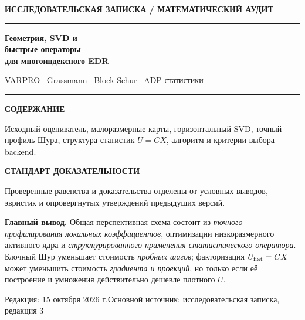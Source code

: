 \documentclass[10.5pt,a4paper]{article}
\numberwithin{equation}{section}
\theoremstyle{plain}
\theoremstyle{definition}
\newcommand{\smallcaps}[1]{{\sffamily\bfseries\MakeUppercase{#1}}}
\begin{document}
\thispagestyle{empty}
\vspace*{17mm}
{\sffamily\color{teal}\bfseries\large ИССЛЕДОВАТЕЛЬСКАЯ ЗАПИСКА \quad / \quad МАТЕМАТИЧЕСКИЙ АУДИТ}\par
\vspace{5mm}
{\color{navy}\rule{\linewidth}{1.5pt}}\par
\vspace{7mm}
{\sffamily\bfseries\fontsize{27}{31}\selectfont\color{navy} Геометрия, SVD и\\[1mm] быстрые операторы\\[1mm] для многоиндексного EDR}\par
\vspace{5mm}
{\sffamily\large\color{muted} VARPRO \textbullet\ Grassmann \textbullet\ Block Schur \textbullet\ ADP-статистики}\par
\vspace{10mm}
{\color{teal}\rule{.25\linewidth}{2pt}}\par
\vspace{5mm}
\begin{minipage}[t]{.48\linewidth}
\smallcaps{Содержание}\par
\small Исходный оцениватель, малоразмерные карты, горизонтальный SVD, точный профиль Шура, структура статистик $U=CX$, алгоритм и критерии выбора backend.
\end{minipage}\hfill
\begin{minipage}[t]{.45\linewidth}
\smallcaps{Стандарт доказательности}\par
\small Проверенные равенства и доказательства отделены от условных выводов, эвристик и опровергнутых утверждений предыдущих версий.
\end{minipage}
\vfill
\begin{mainbox}
\textbf{Главный вывод.} Общая перспективная схема состоит из \emph{точного профилирования локальных коэффициентов}, оптимизации низкоразмерного активного ядра и \emph{структурированного применения статистического оператора}. Блочный Шур уменьшает стоимость \emph{пробных шагов}; факторизация $U_{\rm flat}=CX$ может уменьшить стоимость \emph{градиента и проекций}, но только если её построение и умножения действительно дешевле плотного $U$.
\end{mainbox}
\vspace{4mm}
{\sffamily\small\color{muted} Редакция: 15 октября 2026 г.\hfill Основной источник: исследовательская записка, редакция 3}\par
\newpage
\tableofcontents
\clearpage
\end{document}
